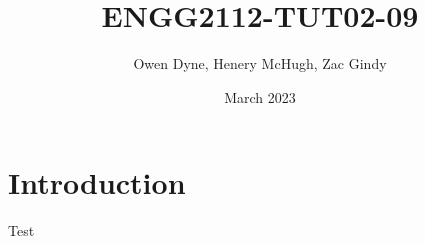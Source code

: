 \documentclass{article}
\title{ENGG2112-TUT02-09}
\author{Owen Dyne, Henery McHugh, Zac Gindy}
\date{March 2023}
\begin{document}
\maketitle

\section{Introduction}

Test 
\end{document}
